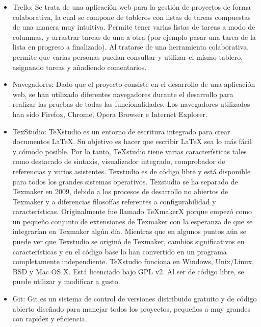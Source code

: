 \documentclass[12pt, a4paper, twoside]{book}
\begin{document}
	\begin{itemize}
		\item Trello: Se trata de una aplicación web para la gestión de proyectos de forma colaborativa, la cual se compone de tableros con listas de tareas compuestas de una manera muy intuitiva. Permite tener varias listas de tareas a modo de columnas, y arrastrar tareas de una a otra (por ejemplo pasar una tarea de la lista en progreso a finalizado). Al tratarse de una herramienta colaborativa, permite que varias personas puedan consultar y utilizar el mismo tablero, asignando tareas y añadiendo comentarios.
		\item Navegadores: Dado que el proyecto consiste en el desarrollo de una aplicación web, se han utilizado diferentes navegadores durante el desarrollo para realizar las pruebas de todas las funcionalidades. Los navegadores utilizados han sido Firefox, Chrome, Opera Browser e Internet Explorer.
		\item TexStudio: TeXstudio es un entorno de escritura integrado para crear documentos LaTeX. Su objetivo es hacer que escribir LaTeX sea lo más fácil y cómodo posible. Por lo tanto, TeXstudio tiene varias características tales como destacado de sintaxis, visualizador integrado, comprobador de referencias y varios asistentes. 
		Texstudio es de código libre y está disponible para todos los grandes sistemas operativos. Texstudio se ha separado de Texmaker en 2009, debido a los procesos de desarrollo no abiertos de Texmaker y a diferencias filosofías referentes a configurabilidad y características. Originalmente fue llamado TeXmakerX porque empezó como un pequeño conjunto de extensiones de Texmaker con la esperanza de que se integrarían en Texmaker algún día. Mientras que en algunos puntos aún se puede ver que Texstudio se originó de Texmaker, cambios significativos en características y en el código base lo han convertido en un programa completamente independiente. 
		TeXstudio funciona en Windows, Unix/Linux, BSD y Mac OS X. Está licenciado bajo GPL v2. Al ser de código libre, se puede utilizar y modificar a gusto.\cite{TexStudio}
		\item Git\cite{Git}:
		Git es un sistema de control de versiones distribuido gratuito y de código abierto diseñado para manejar todos los proyectos, pequeños a muy grandes con rapidez y eficiencia.
		

\end{itemize}
\end{document}
